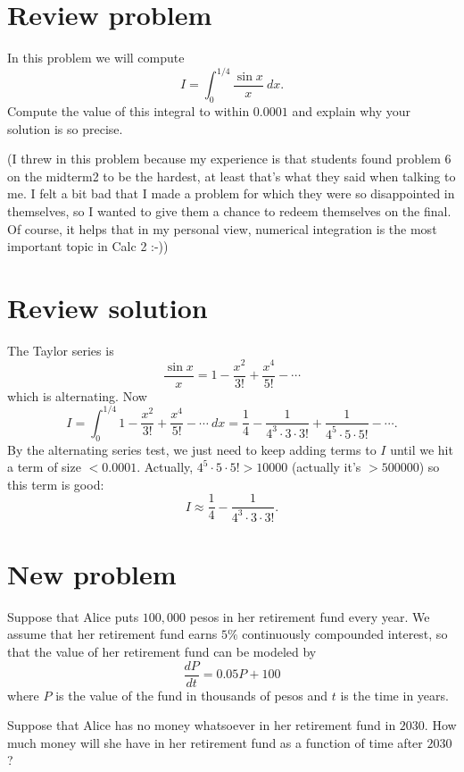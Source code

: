 \documentclass[10pt]{article}
\theoremstyle{definition}
\begin{document}
\noindent

\section{Review problem}
In this problem we will compute
$$I = \int_0^{1/4} \frac{\sin x}{x} ~dx.$$
Compute the value of this integral to within $0.0001$ and explain why your solution is so precise.

(I threw in this problem because my experience is that students found problem 6 on the midterm2 to be the hardest, at least that's what they said when talking to me. 
I felt a bit bad that I made a problem for which they were so disappointed in themselves, so I wanted to give them a chance to redeem themselves on the final.
Of course, it helps that in my personal view, numerical integration is the most important topic in Calc 2 :-))

\section{Review solution}
The Taylor series is 
$$\frac{\sin x}{x} = 1 - \frac{x^2}{3!} + \frac{x^4}{5!} - \cdots$$
which is alternating. Now 
$$I = \int_0^{1/4} 1 - \frac{x^2}{3!} + \frac{x^4}{5!} - \cdots ~dx = \frac{1}{4} - \frac{1}{4^3 \cdot 3 \cdot 3!} + \frac{1}{4^5 \cdot 5 \cdot 5!} - \cdots.$$
By the alternating series test, we just need to keep adding terms to $I$ until we hit a term of size $< 0.0001$. Actually, $4^5 \cdot 5 \cdot 5! > 10000$ (actually it's $> 500000$) so this term is good:
$$I \approx \frac{1}{4} - \frac{1}{4^3 \cdot 3 \cdot 3!}.$$

\section{New problem}
Suppose that Alice puts $100,000$ pesos in her retirement fund every year.
We assume that her retirement fund earns $5\%$ continuously compounded interest, so that the value of her retirement fund can be modeled by 
$$\frac{dP}{dt} = 0.05P + 100$$
where $P$ is the value of the fund in thousands of pesos and $t$ is the time in years.

Suppose that Alice has no money whatsoever in her retirement fund in $2030$.
How much money will she have in her retirement fund as a function of time after $2030$?
\end{document}
